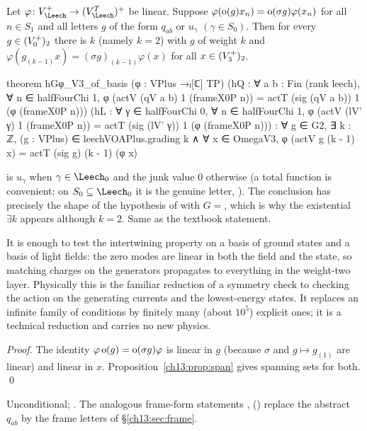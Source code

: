 \begin{theorem}\label{ch13:thm:basis-red}
Let $\varphi\colon V_\Leech^+\to(V_\Leech^T)^+$ be linear. Suppose
$\varphi(\operatorname{o}(g)x_n)=\operatorname{o}(\sigma g)\varphi(x_n)$ for all $n\in S_1$ and all letters $g$ of the
form $q_{ab}$ or $u_\gamma$ $(\gamma\in S_0)$. Then for every $g\in(V_0^{+})_2$ there is $k$ (namely $k=2$)
with $g$ of weight $k$ and $\varphi(g_{(k-1)}x)=(\sigma g)_{(k-1)}\varphi(x)$ for all $x\in(V_3^{+})_2$.
\end{theorem}
\begin{leancode}
theorem hGφ_V3_of_basis (φ : VPlus →ₗ[ℂ] TP)
    (hQ : ∀ a b : Fin (rank leech), ∀ n ∈ halfFourChi 1,
      φ (actV (qV a b) 1 (frameX0P n)) = actT (sig (qV a b)) 1 (φ (frameX0P n)))
    (hL : ∀ γ ∈ halfFourChi 0, ∀ n ∈ halfFourChi 1,
      φ (actV (lV' γ) 1 (frameX0P n)) = actT (sig (lV' γ)) 1 (φ (frameX0P n))) :
    ∀ g ∈ G2, ∃ k : ℤ, (g : VPlus) ∈ leechVOAPlus.grading k ∧
      ∀ x ∈ OmegaV3, φ (actV g (k - 1) x) = actT (sig g) (k - 1) (φ x)
\end{leancode}
\begin{dictionary}
 is $u_\gamma$ when $\gamma\in\Leech_0$ and the junk value $0$ otherwise (a total function is
convenient; on $S_0\subseteq\Leech_0$ it is the genuine letter, ). The conclusion has precisely
the shape of the hypothesis  of  with $G=$, which
is why the existential $\exists k$ appears although $k=2$. Same as the textbook statement.
\end{dictionary}
\begin{physics}
It is enough to test the intertwining property on a basis of ground states and a basis of light fields: the zero modes are linear in both the field and the state, so matching charges on the generators propagates to everything in the weight-two layer. Physically this is the familiar reduction of a symmetry check to checking the action on the generating currents and the lowest-energy states. It replaces an infinite family of conditions by finitely many (about $10^5$) explicit ones; it is a technical reduction and carries no new physics.
\end{physics}
\noindent\emph{Proof.} The identity $\varphi\operatorname{o}(g)=\operatorname{o}(\sigma g)\varphi$ is linear in $g$ (because
$\sigma$ and $g\mapsto g_{(1)}$ are linear) and linear in $x$. Proposition~\ref{ch13:prop:span} gives
spanning sets for both. \qed
\begin{status}
Unconditional; . The analogous frame-form statements
,  () replace the abstract
$q_{ab}$ by the frame letters of \S\ref{ch13:sec:frame}.
\end{status}

